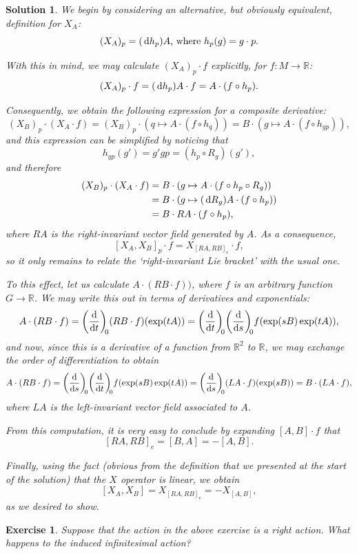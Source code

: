 \documentclass{article}
\newtheorem{ex}{Exercise}
\theoremstyle{nonumberplain}
\newtheorem{sol}{Solution}
\newcommand{\R}{\mathbb{R}}
\begin{document}
\begin{sol}
We begin by considering an alternative, but obviously equivalent, definition for $X_A$:
\[(X_A)_p = (\dl h_p) A\text{, where $h_p(g) = g \cdot p$.}\]

With this in mind, we may calculate $(X_A)_p \cdot f$ explicitly, for $f \colon M \to \R$:
\[(X_A)_p \cdot f = (\dl h_p) A \cdot f = A \cdot (f \circ h_p).\]

Consequently, we obtain the following expression for a composite derivative:
\[(X_B)_p \cdot (X_A \cdot f) = (X_B)_p \cdot (q \mapsto A \cdot (f \circ h_q)) = B \cdot (g \mapsto A \cdot (f \circ h_{gp})),\]
and this expression can be simplified by noticing that
\[h_{gp}(g') = g' g p = (h_p \circ R_g)(g'),\]
and therefore
\begin{align*}
(X_B)_p \cdot (X_A \cdot f) &= B \cdot (g \mapsto A \cdot (f \circ h_{p} \circ R_g))\\
&= B \cdot (g \mapsto (\dl R_g) A \cdot (f \circ h_{p}))\\
&= B \cdot RA \cdot (f \circ h_p),
\end{align*}
where $RA$ is the \emph{right}-invariant vector field generated by $A$. As a consequence,
\[ [X_A, X_B]_p \cdot f = X_{[RA,RB]_e} \cdot f,\]
so it only remains to relate the `right-invariant Lie bracket' with the usual one.

To this effect, let us calculate $A \cdot (RB \cdot f))$, where $f$ is an arbitrary function $G \to \R$. We may write this out in terms of derivatives and exponentials:
\[A \cdot (RB \cdot f) = \diff{}t[0] (RB \cdot f)(\exp(tA)) = \diff{}t[0] \diff{}s[0] f(\exp(sB) \exp(tA)),\]
and now, since this is a derivative of a function from $\R^2$ to $\R$, we may exchange the order of differentiation to obtain
\[A \cdot (RB \cdot f) = \diff{}s[0] \diff{}t[0] f(\exp(sB) \exp(tA)) = \diff{}s[0] (LA \cdot f)(\exp(sB)) = B \cdot (LA \cdot f),\]
where $LA$ is the left-invariant vector field associated to $A$.

From this computation, it is very easy to conclude by expanding $[A,B] \cdot f$ that
\[ [RA,RB]_e = [B,A] = -[A,B].\]

Finally, using the fact (obvious from the definition that we presented at the start of the solution) that the $X$ operator is linear, we obtain
\[[X_A, X_B] = X_{[RA,RB]_e} = -X_{[A,B]},\]
as we desired to show.
\end{sol}

\begin{ex}
Suppose that the action in the above exercise is a right action. What happens to the induced infinitesimal action?
\end{ex}
\end{document}

